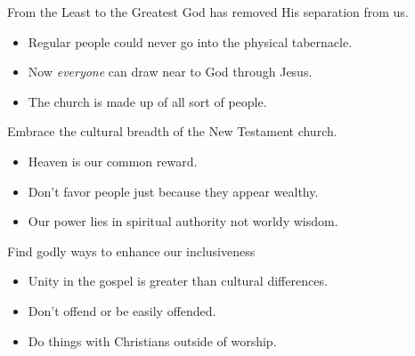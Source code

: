 \begin{frame}{From the Least to the Greatest}
	God has removed His separation from us.
	\begin{itemize}
		\item Regular people could never go into the physical tabernacle.
		\item Now \emph{everyone} can draw near to God through Jesus.
		\item The church is made up of all sort of people.	
	\end{itemize}
	Embrace the cultural breadth of the New Testament church.
	\begin{itemize}
		\item Heaven is our common reward.
		\item Don't favor people just because they appear wealthy.
		\item Our power lies in spiritual authority not worldy wisdom.
	\end{itemize}
	Find godly ways to enhance our inclusiveness
	\begin{itemize}
		\item Unity in the gospel is greater than cultural differences.
		\item Don't offend or be easily offended.
		\item Do things with Christians outside of worship.
	\end{itemize}
	
\end{frame}
